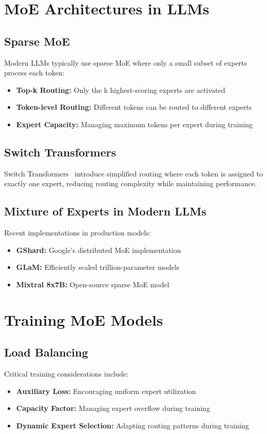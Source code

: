 \section{MoE Architectures in LLMs}
\label{sec:moe_architectures}

\subsection{Sparse MoE}
\noindent
Modern LLMs typically use sparse MoE where only a small subset of experts process each token:
\begin{itemize}
    \item \textbf{Top-k Routing:} Only the k highest-scoring experts are activated
    \item \textbf{Token-level Routing:} Different tokens can be routed to different experts
    \item \textbf{Expert Capacity:} Managing maximum tokens per expert during training
\end{itemize}

\subsection{Switch Transformers}
\noindent
Switch Transformers~\cite{fedus2021switch} introduce simplified routing where each token is assigned to exactly one expert, reducing routing complexity while maintaining performance.

\subsection{Mixture of Experts in Modern LLMs}
\noindent
Recent implementations in production models:
\begin{itemize}
    \item \textbf{GShard:} Google's distributed MoE implementation
    \item \textbf{GLaM:} Efficiently scaled trillion-parameter models
    \item \textbf{Mixtral 8x7B:} Open-source sparse MoE model
\end{itemize}

\section{Training MoE Models}
\label{sec:moe_training}

\subsection{Load Balancing}
\noindent
Critical training considerations include:
\begin{itemize}
    \item \textbf{Auxiliary Loss:} Encouraging uniform expert utilization
    \item \textbf{Capacity Factor:} Managing expert overflow during training
    \item \textbf{Dynamic Expert Selection:} Adapting routing patterns during training
\end{itemize}


